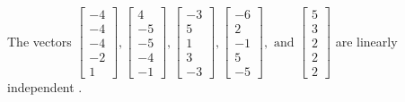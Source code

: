 \begin{exercise}
\begin{exerciseStatement}
  \end{exerciseStatement}
  \begin{exerciseAnswer}
   The vectors \(\left[\begin{array}{r}
-4 \\
-4 \\
-4 \\
-2 \\
1
\end{array}\right] , \left[\begin{array}{r}
4 \\
-5 \\
-5 \\
-4 \\
-1
\end{array}\right] , \left[\begin{array}{r}
-3 \\
5 \\
1 \\
3 \\
-3
\end{array}\right] , \left[\begin{array}{r}
-6 \\
2 \\
-1 \\
5 \\
-5
\end{array}\right] , \text{ and } \left[\begin{array}{r}
5 \\
3 \\
2 \\
2 \\
2
\end{array}\right]\) are 
  	 linearly independent  .
  


  \end{exerciseAnswer}
\end{exercise}